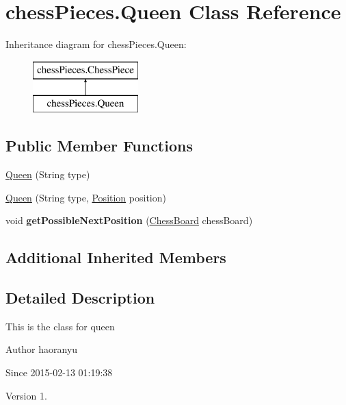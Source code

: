 \hypertarget{classchess_pieces_1_1_queen}{\section{chess\+Pieces.\+Queen Class Reference}
\label{classchess_pieces_1_1_queen}
}
Inheritance diagram for chess\+Pieces.\+Queen\+:\begin{figure}[H]
\begin{center}
\leavevmode
\includegraphics[height=2.000000cm]{classchess_pieces_1_1_queen}
\end{center}
\end{figure}
\subsection*{Public Member Functions}
\begin{DoxyCompactItemize}
\item 
\hyperlink{classchess_pieces_1_1_queen_a72bb7eddfbc1b52ccb3869454cacf631}{Queen} (String type)
\item 
\hyperlink{classchess_pieces_1_1_queen_a722ac44808afa09a2a381c17dd27d363}{Queen} (String type, \hyperlink{classmodels_1_1_position}{Position} position)
\item 
\hypertarget{classchess_pieces_1_1_queen_a3b76122829ccf1bee5f1cacbdbc6ae95}{void {\bfseries get\+Possible\+Next\+Position} (\hyperlink{classmodels_1_1_chess_board}{Chess\+Board} chess\+Board)}\label{classchess_pieces_1_1_queen_a3b76122829ccf1bee5f1cacbdbc6ae95}

\end{DoxyCompactItemize}
\subsection*{Additional Inherited Members}


\subsection{Detailed Description}
This is the class for queen \begin{DoxyAuthor}{Author}
haoranyu 
\end{DoxyAuthor}
\begin{DoxySince}{Since}
2015-\/02-\/13 01\+:19\+:38 
\end{DoxySince}
\begin{DoxyVersion}{Version}
1. 
\end{DoxyVersion}



